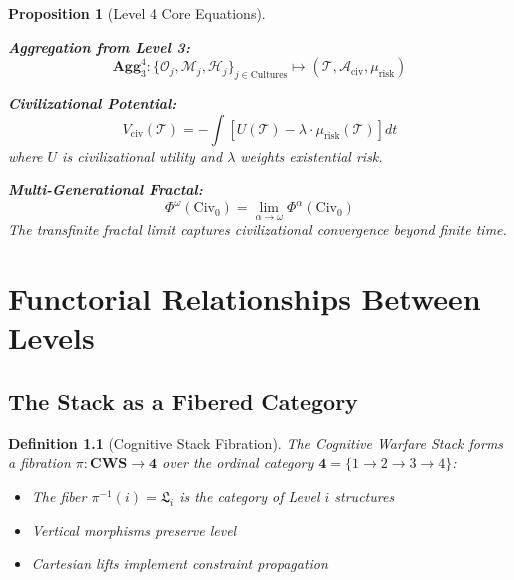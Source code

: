\documentclass[11pt,twoside]{book}
\newcommand{\TransFrac}[1]{\Phi^{#1}}
\newcommand{\Level}[1]{\mathfrak{L}_{#1}}
\newcommand{\Overton}{\mathcal{O}}
\newcommand{\Memetic}{\mathcal{M}}
\newcommand{\Hyperstition}{\mathcal{H}}
\newcommand{\Trajectory}{\mathcal{T}}
\newcommand{\Aggregate}[2]{\mathbf{Agg}_{#1}^{#2}}
\newtheorem{definition}{Definition}[chapter]
\newtheorem{proposition}{Proposition}[chapter]
\begin{document}
\begin{proposition}[Level 4 Core Equations]
\label{prop:L4-equations}

\textbf{Aggregation from Level 3:}
\begin{equation}
    \Aggregate{3}{4} : \{\Overton_j, \Memetic_j, \Hyperstition_j\}_{j \in \mathrm{Cultures}}
    \mapsto (\Trajectory, \mathcal{A}_{\mathrm{civ}}, \mu_{\mathrm{risk}})
\end{equation}

\textbf{Civilizational Potential:}
\begin{equation}
    V_{\mathrm{civ}}(\Trajectory) = -\int \left[ U(\Trajectory) - \lambda \cdot \mu_{\mathrm{risk}}(\Trajectory) \right] dt
\end{equation}
where $U$ is civilizational utility and $\lambda$ weights existential risk.

\textbf{Multi-Generational Fractal:}
\begin{equation}
    \TransFrac{\omega}(\mathrm{Civ}_0) = \lim_{\alpha \to \omega} \TransFrac{\alpha}(\mathrm{Civ}_0)
\end{equation}
The transfinite fractal limit captures civilizational convergence beyond finite time.
\end{proposition}

\chapter{Functorial Relationships Between Levels}
\label{ch:functorial}

\section{The Stack as a Fibered Category}

\begin{definition}[Cognitive Stack Fibration]
\label{def:stack-fibration}
The Cognitive Warfare Stack forms a fibration $\pi : \mathbf{CWS} \to \mathbf{4}$ over
the ordinal category $\mathbf{4} = \{1 \to 2 \to 3 \to 4\}$:
\begin{itemize}
    \item The fiber $\pi^{-1}(i) = \Level{i}$ is the category of Level $i$ structures
    \item Vertical morphisms preserve level
    \item Cartesian lifts implement constraint propagation
\end{itemize}
\end{definition}
\end{document}
